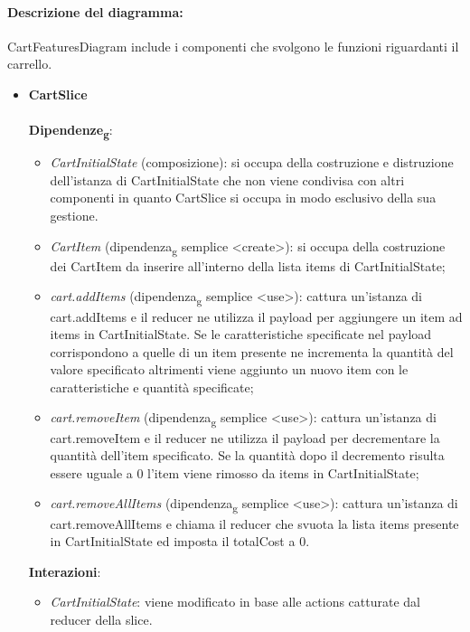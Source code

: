 \paragraph*{Descrizione del diagramma:}
CartFeaturesDiagram include i componenti che svolgono le funzioni riguardanti il carrello.
\begin{itemize}
		\item \textbf{CartSlice}
		\\\\
		\textbf{Dipendenze\textsubscript{g}}:
		\begin{itemize}
			\item \textit{CartInitialState} (composizione): si occupa della costruzione e distruzione dell'istanza di CartInitialState
			che non viene condivisa con altri componenti in quanto CartSlice si occupa in modo esclusivo della sua gestione.
			\item \textit{CartItem} (dipendenza\textsubscript{g} semplice \textless create\textgreater): si occupa della costruzione dei CartItem 
			da inserire all'interno della lista items di CartInitialState;
			\item \textit{cart.addItems} (dipendenza\textsubscript{g} semplice \textless use\textgreater): cattura un'istanza di cart.addItems e il 
			reducer ne utilizza il payload per aggiungere un item ad items in CartInitialState.
			Se le caratteristiche specificate nel payload corrispondono a quelle di un item presente ne incrementa la quantità 
			del valore specificato altrimenti viene aggiunto un nuovo item con le caratteristiche e quantità specificate;  
			\item \textit{cart.removeItem} (dipendenza\textsubscript{g} semplice \textless use\textgreater): cattura un'istanza di cart.removeItem e il reducer
			ne utilizza il payload per decrementare la quantità dell'item specificato.
			Se la quantità dopo il decremento risulta essere uguale a 0 l'item viene rimosso da items in CartInitialState;
			\item \textit{cart.removeAllItems} (dipendenza\textsubscript{g} semplice \textless use\textgreater): cattura un'istanza di cart.removeAllItems e chiama il reducer 
			che svuota la lista items presente in CartInitialState ed imposta il totalCost a 0.
		\end{itemize}
		\textbf{Interazioni}:
		\begin{itemize}
			\item \textit{CartInitialState}: viene modificato in base alle actions catturate dal reducer della slice.
		\end{itemize}

\end{itemize}
